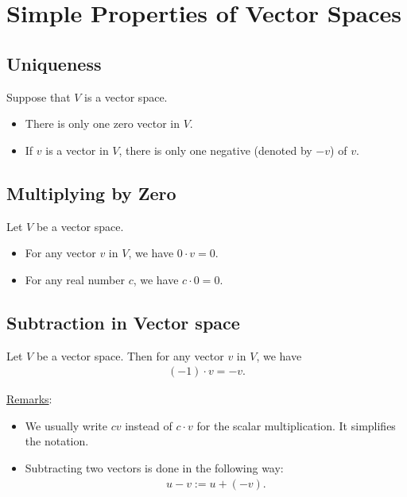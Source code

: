 \documentclass[12pt,a4paper]{article}
\begin{document}
\newpage

\phantom{2}

\newpage

\section{Simple Properties of Vector Spaces}

	\subsection{Uniqueness}
	Suppose that $V$ is a vector space.
		\begin{itemize}
		\item There is only one zero vector in $V$.
		\item If $v$ is a vector in $V$, there is only one negative (denoted by $-v$) of $v$.
		\end{itemize}
	
	\vspace*{18pt}
	
	\subsection{Multiplying by Zero}
	Let $V$ be a vector space.
		\begin{itemize}
		\item For any vector $v$ in $V$, we have $0 \cdot v = 0$.
		\item For any real number $c$, we have $c \cdot 0 = 0$.
		\end{itemize}
	
	\vspace*{18pt}
	
	\subsection{Subtraction in Vector space}
	
	Let $V$ be a vector space. Then for any vector $v$ in $V$, we have
		\begin{align*}
		(-1) \cdot v = -v .
		\end{align*}
	
	\vspace*{24pt}
	
	\underline{Remarks}:
		\begin{itemize}
		\item We usually write $c v$ instead of $c \cdot v$ for the scalar multiplication. It simplifies the notation.
		\item Subtracting two vectors is done in the following way: 
			\begin{align*}
			u - v := u + (-v) .
			\end{align*}
		\end{itemize}
	
\end{document}
